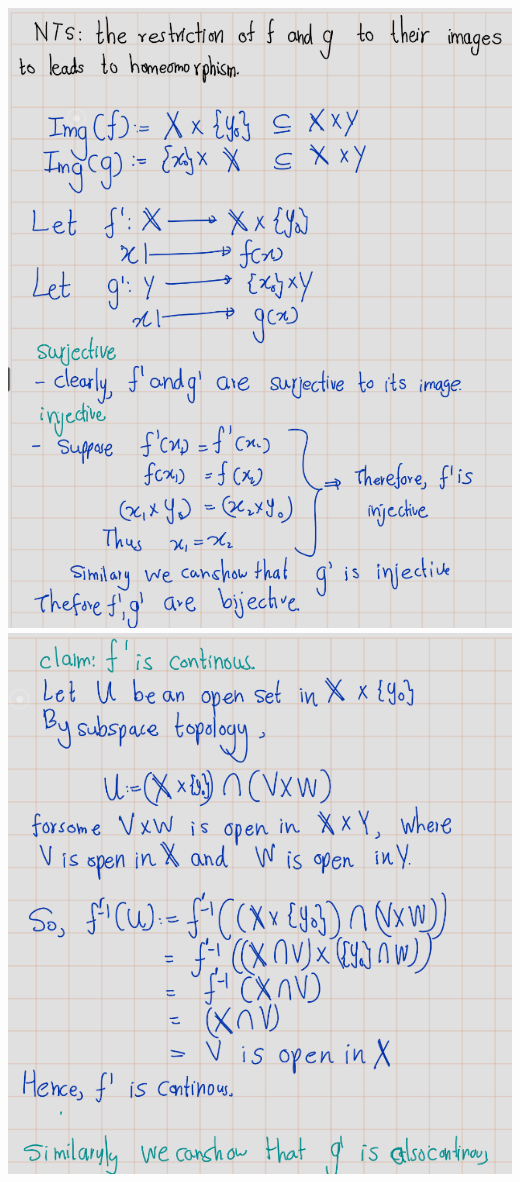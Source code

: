 \documentclass[
]{book}
\theoremstyle{definition}
\theoremstyle{definition}
\theoremstyle{definition}
\theoremstyle{definition}
\theoremstyle{remark}
\begin{document}
\includegraphics{figures/Exercises/Ex 2.18/ex-4-1.png}
\includegraphics{figures/Exercises/Ex 2.18/ex-4-2.png}
\end{document}
